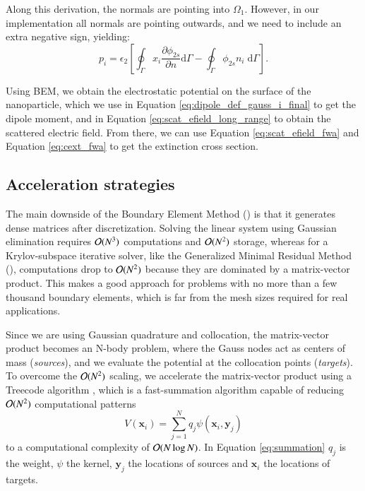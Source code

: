 %
Along this derivation, the normals are pointing into $\Omega_1$. However, in our implementation 
all normals are pointing outwards, and we need to include an extra negative sign, yielding:
%
\begin{equation} \label{eq:dipole_def_gauss_i_final}
{p_i} = \epsilon_2 \left[ \oint_\Gamma  x_i  \frac{\partial \phi_{2s}}{\partial n} \text{d}\Gamma - \oint_\Gamma \phi_{2s} n_i \; \text{d}\Gamma \right].
\end{equation}

Using BEM, we obtain the electrostatic potential on the surface of the nanoparticle, 
which we use in Equation \eqref{eq:dipole_def_gauss_i_final} to get the dipole 
moment, and in Equation \eqref{eq:scat_efield_long_range} to obtain the scattered
electric field. From there, we can use Equation \eqref{eq:scat_efield_fwa} and Equation 
\eqref{eq:cext_fwa} to get the extinction cross section.

\subsection{Acceleration strategies} \label{sec:acc_strategies}

The main downside of the Boundary Element Method (\bem) is that it generates dense matrices
after discretization. Solving the linear system using
Gaussian elimination requires $\mathcal{O}(N^3)$ computations and $\mathcal{O}(N^2)$ storage, whereas for a
Krylov-subspace iterative solver, like the Generalized Minimal Residual Method (\gmres),
computations drop to $\mathcal{O}(N^2)$ because they are dominated by a matrix-vector 
product. This makes \bem a good approach for problems with no more than a few thousand boundary elements,
which is far from the mesh sizes required for real applications. 

Since we are using Gaussian quadrature and collocation, the matrix-vector product
becomes an N-body problem, where the Gauss nodes act as centers of mass (\emph{sources}), and we evaluate
the potential at the collocation points (\emph{targets}).
To overcome the $\mathcal{O}(N^2)$ scaling,
we accelerate the matrix-vector product using a Treecode algorithm \cite{BarnesHut1986,DuanKrasny2001}, 
which is a fast-summation algorithm capable of reducing $\mathcal{O}(N^2)$
computational patterns 
%
\begin{equation} \label{eq:summation}
V(\mathbf{x}_i) = \sum_{j=1}^{N} q_j \psi(\mathbf{x}_i, \mathbf{y}_j) 
\end{equation}
%
\noindent to a computational complexity of $\mathcal{O}(N \log N)$. In Equation \eqref{eq:summation} 
$q_j$ is the weight, $\psi$ the kernel, $\mathbf{y}_j$ the locations of sources and 
$\mathbf{x}_i$ the locations of targets.

